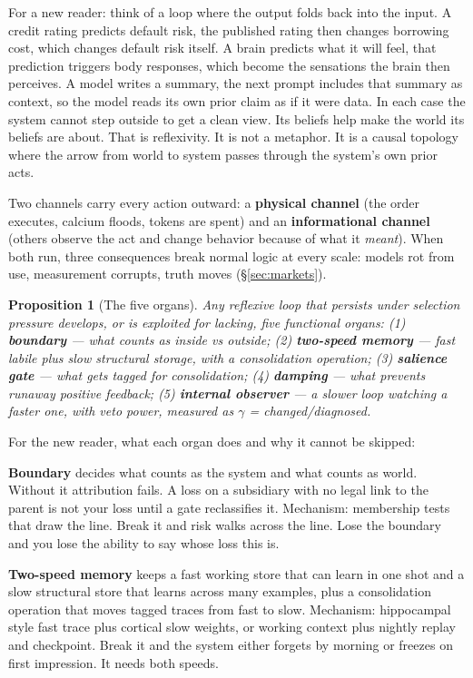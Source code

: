 \documentclass[11pt]{article}
\newtheorem{proposition}{Proposition}[section]
\begin{document}
For a new reader: think of a loop where the output folds back into the input. A credit rating predicts default risk, the published rating then changes borrowing cost, which changes default risk itself. A brain predicts what it will feel, that prediction triggers body responses, which become the sensations the brain then perceives. A model writes a summary, the next prompt includes that summary as context, so the model reads its own prior claim as if it were data. In each case the system cannot step outside to get a clean view. Its beliefs help make the world its beliefs are about. That is reflexivity. It is not a metaphor. It is a causal topology where the arrow from world to system passes through the system's own prior acts.

Two channels carry every action outward: a \textbf{physical channel} (the order executes, calcium floods, tokens are spent) and an \textbf{informational channel} (others observe the act and change behavior because of what it \emph{meant}). When both run, three consequences break normal logic at every scale: models rot from use, measurement corrupts, truth moves (\S\ref{sec:markets}).

\begin{proposition}[The five organs]
Any reflexive loop that persists under selection pressure develops, or is exploited for lacking, five functional organs: (1) \textbf{boundary} --- what counts as inside vs outside; (2) \textbf{two-speed memory} --- fast labile plus slow structural storage, with a consolidation operation; (3) \textbf{salience gate} --- what gets tagged for consolidation; (4) \textbf{damping} --- what prevents runaway positive feedback; (5) \textbf{internal observer} --- a slower loop watching a faster one, with veto power, measured as $\gamma$ = changed/diagnosed.
\end{proposition}

For the new reader, what each organ does and why it cannot be skipped:

\textbf{Boundary} decides what counts as the system and what counts as world. Without it attribution fails. A loss on a subsidiary with no legal link to the parent is not your loss until a gate reclassifies it. Mechanism: membership tests that draw the line. Break it and risk walks across the line. Lose the boundary and you lose the ability to say whose loss this is.

\textbf{Two-speed memory} keeps a fast working store that can learn in one shot and a slow structural store that learns across many examples, plus a consolidation operation that moves tagged traces from fast to slow. Mechanism: hippocampal style fast trace plus cortical slow weights, or working context plus nightly replay and checkpoint. Break it and the system either forgets by morning or freezes on first impression. It needs both speeds.
\end{document}
